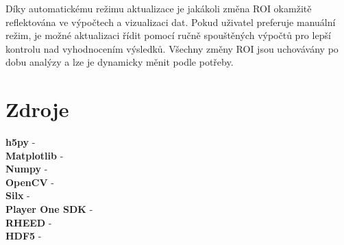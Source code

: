 \documentclass{article}
\begin{document}
Díky automatickému režimu aktualizace je jakákoli změna ROI okamžitě reflektována ve výpočtech a vizualizaci dat. Pokud uživatel preferuje manuální režim, je možné aktualizaci řídit pomocí ručně spouštěných výpočtů pro lepší kontrolu nad vyhodnocením výsledků. Všechny změny ROI jsou uchovávány po dobu analýzy a lze je dynamicky měnit podle potřeby.
\newpage
\section{Zdroje}
\textbf{h5py} - \cite{h5pyDocs}\\
\textbf{Matplotlib} - \cite{matplotlibDocs}\\
\textbf{Numpy} - \cite{numpyDocs}\\
\textbf{OpenCV} - \cite{opencvDocs}\\
\textbf{Silx} - \cite{silxDocs}\\
\textbf{Player One SDK} - \cite{PlayerOneSDK}\\
\textbf{RHEED} - \cite{RHEED}\\
\textbf{HDF5} - \cite{WhatIsHDF5}\\
\printbibliography
\end{document}
